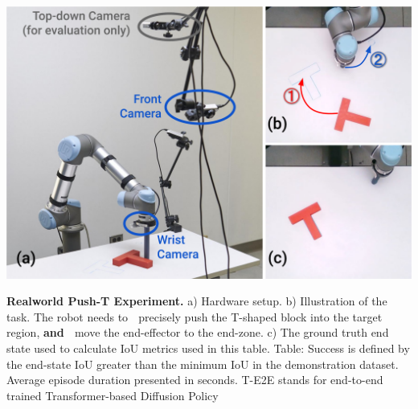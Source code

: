 \begin{table}[t]
\centering
\includegraphics[width=0.9\linewidth]{figure/real_task_setup.pdf}

\vspace{2mm}


\caption{\textbf{Realworld Push-T Experiment.} 
\label{tab:real_pusht}
a) Hardware setup.  
b) Illustration of the task. The robot needs to \textcircled{} precisely push the T-shaped block into the target region, \textbf{and} \textcircled{} move the end-effector to the end-zone. 
c) The ground truth end state used to calculate IoU metrics used in this table. Table: Success is defined by the end-state IoU greater than the minimum IoU in the demonstration dataset. Average episode duration presented in seconds. T-E2E stands for end-to-end trained Transformer-based Diffusion Policy}

\vspace{-4mm}
\end{table}

